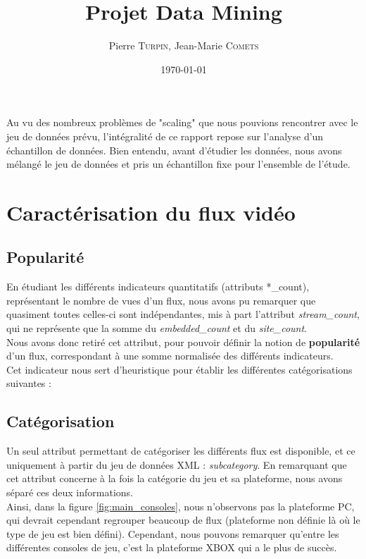 \documentclass[11pt, a4paper, titlepage]{scrartcl}
\title{Projet Data Mining}
\author{Pierre \textsc{Turpin}, Jean-Marie \textsc{Comets}}
\date{\today}
\begin{document}
\maketitle
\tableofcontents
\newpage

Au vu des nombreux problèmes de "scaling" que nous pouvions rencontrer
avec le jeu de données prévu, l'intégralité de ce rapport repose sur
l'analyse d'un échantillon de données. Bien entendu, avant d'étudier les
données, nous avons mélangé le jeu de données et pris un échantillon fixe pour
l'ensemble de l'étude.

\section{Caractérisation du flux vidéo}

\subsection{Popularité}

En étudiant les différents indicateurs quantitatifs (attributs *\_count),
représentant le nombre de vues d'un flux, nous avons pu remarquer que
quasiment toutes celles-ci sont indépendantes, mis à part l'attribut
\textit{stream\_count}, qui ne représente que la somme du
\textit{embedded\_count} et du \textit{site\_count}. \\

Nous avons donc retiré cet attribut, pour pouvoir définir la notion de
\textbf{popularité} d'un flux, correspondant à une somme normalisée des
différents indicateurs. \\

Cet indicateur nous sert d'heuristique pour établir les différentes
catégorisations suivantes :

\subsection{Catégorisation}

Un seul attribut permettant de catégoriser les différents flux est disponible,
et ce uniquement à partir du jeu de données XML : \textit{subcategory}. En
remarquant que cet attribut concerne à la fois la catégorie du jeu et sa
plateforme, nous avons séparé ces deux informations. \\

Ainsi, dans la figure \ref{fig:main_consoles}, nous n'observons pas la
plateforme PC, qui devrait cependant regrouper beaucoup de flux (plateforme non
définie là où le type de jeu est bien défini). Cependant, nous pouvons
remarquer qu'entre les différentes consoles de jeu, c'est la plateforme XBOX
qui a le plus de succès. \\
\end{document}

